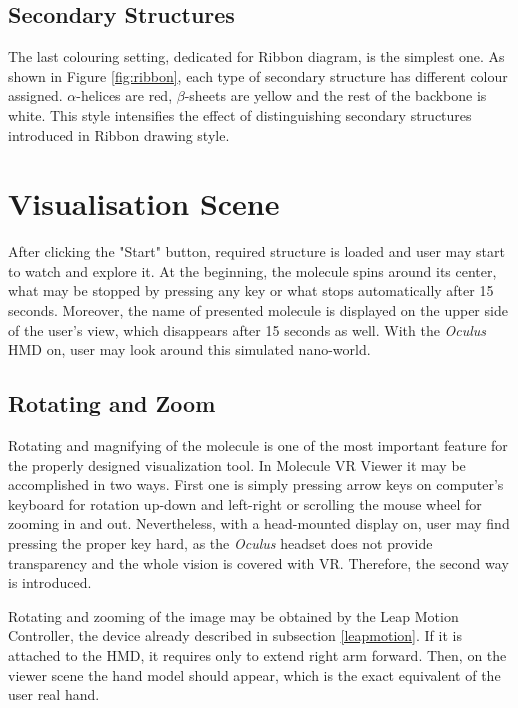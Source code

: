 \subsection{Secondary Structures}
The last colouring setting, dedicated for Ribbon diagram, is the simplest one. As shown in Figure \ref{fig:ribbon}, each type of secondary structure has different colour assigned. $\alpha$-helices are red, $\beta$-sheets are yellow and the rest of the backbone is white. This style intensifies the effect of distinguishing secondary structures introduced in Ribbon drawing style.

\section{Visualisation Scene} %

After clicking the "Start" button, required structure is loaded and user may start to watch and explore it. At the beginning, the molecule spins around its center, what may be stopped by pressing any key or what stops automatically after 15 seconds. Moreover, the name of presented molecule is displayed on the upper side of the user's view, which disappears after 15 seconds as well. With the \textit{Oculus} HMD on, user may look around this simulated nano-world.

\subsection{Rotating and Zoom}

Rotating and magnifying of the molecule is one of the most important feature for the properly designed visualization tool. In Molecule VR Viewer it may be accomplished in two ways. First one is simply pressing arrow keys on computer's keyboard for rotation up-down and left-right or scrolling the mouse wheel for zooming in and out. Nevertheless, with a head-mounted display on, user may find pressing the proper key hard, as the \textit{Oculus} headset does not provide transparency and the whole vision is covered with VR. Therefore, the second way is introduced.

Rotating and zooming of the image may be obtained by the Leap Motion Controller, the device already described in subsection \ref{leapmotion}. If it is attached to the HMD, it requires only to extend right arm forward. Then, on the viewer scene the hand model should appear, which is the exact equivalent of the user real hand.

